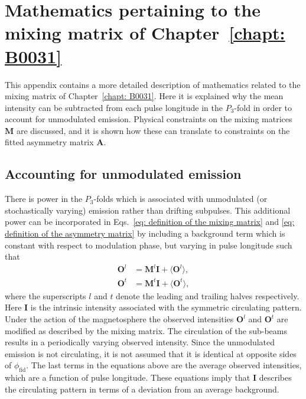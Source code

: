 \chapter[Matrix mathematics]{Mathematics pertaining to the mixing matrix of Chapter~\ref{chapt: B0031}}
\label{app: matrix maths}

This appendix contains a more detailed description of mathematics related to the mixing matrix of Chapter~\ref{chapt: B0031}. Here it is explained why the mean intensity can be subtracted from each pulse longitude in the $P_3$-fold in order to account for unmodulated emission. Physical constraints on the mixing matrices $\mathbf{M}$ are discussed, and it is shown how these can translate to constraints on the fitted asymmetry matrix $\mathbf{A}$.








\section{Accounting for unmodulated emission}
\label{app: matrix maths - accounting for unmodulated emission}


There is power in the $P_3$-folds which is associated with unmodulated (or stochastically varying) emission rather than drifting subpulses. This additional power can be incorporated in Eqs.~\eqref{eq: definition of the mixing matrix} and \eqref{eq: definition of the asymmetry matrix} by including a background term which is constant with respect to modulation phase, but varying in pulse longitude such that
\begin{align}
    \label{eq: mixing matrix with background term}
    \mathbf{O}^l &= \mathbf{M}^l\mathbf{I}+\langle\mathbf{O}^l\rangle,\\
    \mathbf{O}^t &= \mathbf{M}^t\mathbf{I}+\langle\mathbf{O}^t\rangle,
\end{align}
where the superscripts $l$ and $t$ denote the leading and trailing halves respectively. Here $\mathbf{I}$ is the intrinsic intensity associated with the symmetric circulating pattern. Under the action of the magnetosphere the observed intensities $\mathbf{O}^l$ and $\mathbf{O}^t$ are modified as described by the mixing matrix. The circulation of the sub-beams results in a periodically varying observed intensity. Since the unmodulated emission is not circulating, it is not assumed that it is identical at opposite sides of $\phi_\mathrm{fid}$. The last terms in the equations above are the average observed intensities, which are a function of pulse longitude. These equations imply that $\mathbf{I}$ describes the circulating pattern in terms of a deviation from an average background.

